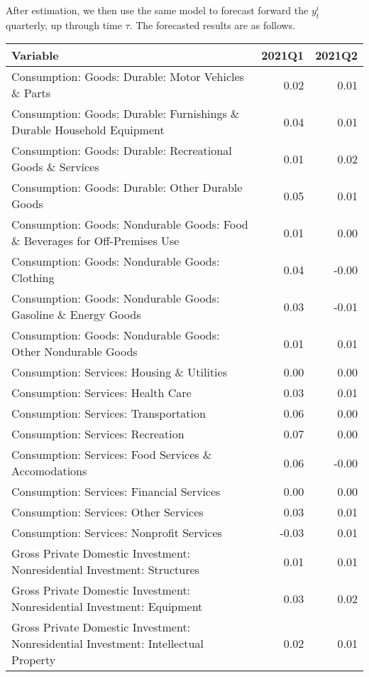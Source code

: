 \documentclass[11pt, letterpaper]{article}\usepackage[]{graphicx}\usepackage[]{color}
\begin{document}
After estimation, we then use the same model to forecast forward the $y^i_t$ quarterly, up through time $\tau$. 
The forecasted results are as follows.
\begin{table}[H]
\centering
\begingroup\scriptsize
\begin{tabular}{lrr}
  \hline
Variable & 2021Q1 & 2021Q2 \\ 
  \hline
Consumption: Goods: Durable: Motor Vehicles \& Parts & 0.02 & 0.01 \\ 
  Consumption: Goods: Durable: Furnishings \& Durable Household Equipment & 0.04 & 0.01 \\ 
  Consumption: Goods: Durable: Recreational Goods \& Services & 0.01 & 0.02 \\ 
  Consumption: Goods: Durable: Other Durable Goods & 0.05 & 0.01 \\ 
  Consumption: Goods: Nondurable Goods: Food \& Beverages for Off-Premises Use & 0.01 & 0.00 \\ 
  Consumption: Goods: Nondurable Goods: Clothing & 0.04 & -0.00 \\ 
  Consumption: Goods: Nondurable Goods: Gasoline \& Energy Goods & 0.03 & -0.01 \\ 
  Consumption: Goods: Nondurable Goods: Other Nondurable Goods & 0.01 & 0.01 \\ 
  Consumption: Services: Housing \& Utilities & 0.00 & 0.00 \\ 
  Consumption: Services: Health Care & 0.03 & 0.01 \\ 
  Consumption: Services: Transportation & 0.06 & 0.00 \\ 
  Consumption: Services: Recreation & 0.07 & 0.00 \\ 
  Consumption: Services: Food Services \& Accomodations & 0.06 & -0.00 \\ 
  Consumption: Services: Financial Services & 0.00 & 0.00 \\ 
  Consumption: Services: Other Services & 0.03 & 0.01 \\ 
  Consumption: Services: Nonprofit Services & -0.03 & 0.01 \\ 
  Gross Private Domestic Investment: Nonresidential Investment: Structures & 0.01 & 0.01 \\ 
  Gross Private Domestic Investment: Nonresidential Investment: Equipment & 0.03 & 0.02 \\ 
  Gross Private Domestic Investment: Nonresidential Investment: Intellectual Property & 0.02 & 0.01 \\ 

\end{tabular}
\end{table}
\end{document}
